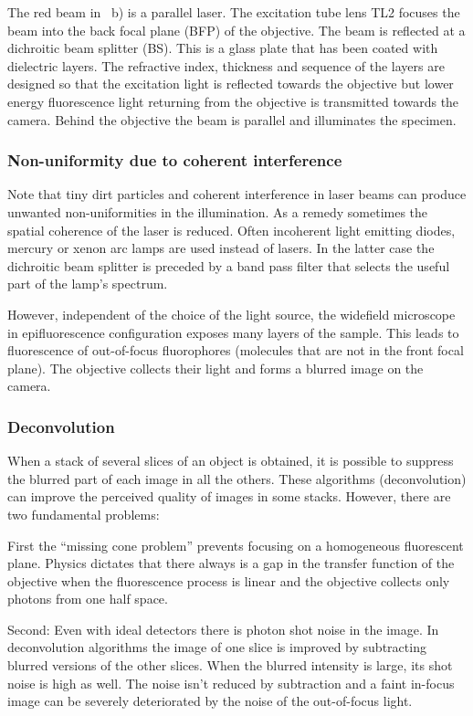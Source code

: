 
The red beam in ~b) is a parallel
laser. The excitation tube lens TL2 focuses the beam into the back
focal plane (BFP) of the objective. The beam is reflected at a
dichroitic beam splitter (BS). This is a glass plate that has been
coated with dielectric layers. The refractive index, thickness and
sequence of the layers are designed so that the excitation light is
reflected towards the objective but lower energy fluorescence light
returning from the objective is transmitted towards the camera. Behind
the objective the beam is parallel and illuminates the specimen.
\subsubsection*{Non-uniformity due to coherent interference}
Note that tiny dirt particles and coherent interference in laser beams
can produce unwanted non-uniformities in the illumination. As a remedy
sometimes the spatial coherence of the laser is reduced. Often
incoherent light emitting diodes, mercury or xenon arc lamps are used
instead of lasers. In the latter case the dichroitic beam splitter is
preceded by a band pass filter that selects the useful part of the
lamp's spectrum.

However, independent of the choice of the light source, the widefield
microscope in epifluorescence configuration exposes many layers of the
sample. This leads to fluorescence of out-of-focus fluorophores
(molecules that are not in the front focal plane). The objective
collects their light and forms a blurred image on the camera.
\subsubsection*{Deconvolution}
When a stack of several slices of an object is obtained, it is
possible to suppress the blurred part of each image in all the
others. These algorithms (deconvolution) can improve the perceived
quality of images in some stacks. However, there are two fundamental
problems:

First the ``missing cone problem'' prevents focusing on a homogeneous
fluorescent plane. Physics dictates that there always is a gap in the
transfer function of the objective when the fluorescence process is
linear and the objective collects only photons from one half space.

Second: Even with ideal detectors there is photon shot noise in the
image. In deconvolution algorithms the image of one slice is improved
by subtracting blurred versions of the other slices. When the blurred
intensity is large, its shot noise is high as well. The noise isn't
reduced by subtraction and a faint in-focus image can be severely
deteriorated by the noise of the out-of-focus light.
